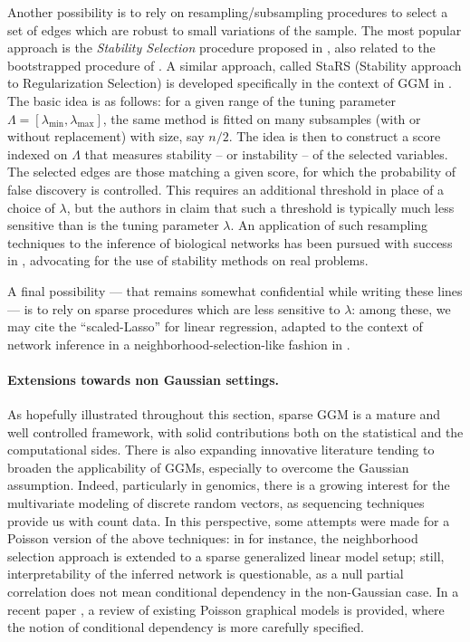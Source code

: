 Another possibility is to rely on resampling/subsampling procedures to
select a  set of  edges which  are robust to  small variations  of the
sample.  The  most popular approach is  the \emph{Stability Selection}
procedure  proposed in  \cite{2010_JRSS_Meinshausen}, also  related to
the  bootstrapped  procedure  of  \cite{bach2008bolasso}.   A  similar
approach,   called  StaRS   (Stability   approach  to   Regularization
Selection)  is  developed  specifically  in  the  context  of  GGM  in
\cite{liu2010stability}. The  basic idea  is as  follows: for  a given
range       of       the        tuning       parameter       $\Lambda=
[\lambda_{\textrm{min}},\lambda_{\textrm{max}}]$,  the same  method is
fitted on many subsamples (with or without replacement) with size, say
$n/2$. The idea is then to construct a score indexed on $\Lambda$ that
measures stability -- or instability -- of the selected variables. The
selected  edges  are those  matching  a  given  score, for  which  the
probability  of  false  discovery  is controlled.   This  requires  an
additional  threshold in  place  of  a choice  of  $\lambda$, but  the
authors  in  \cite{2010_JRSS_Meinshausen,liu2010stability} claim  that
such a threshold  is typically much less sensitive than  is the tuning
parameter $\lambda$.  An application  of such resampling techniques to
the inference of biological networks  has been pursued with success in
\cite{haury2012tigress}, advocating  for the use of  stability methods
on real problems.

A  final  possibility ---  that  remains  somewhat confidential  while
writing these lines --- is to rely on sparse procedures which are less
sensitive to $\lambda$: among these,  we may cite the ``scaled-Lasso''
\cite{sun2012scaled} for linear regression,  adapted to the context of
network   inference  in   a  neighborhood-selection-like   fashion  in
\cite{sun2013sparse}.

\paragraph*{Extensions towards  non Gaussian settings.}   As hopefully
illustrated throughout this  section, sparse GGM is a  mature and well
controlled framework, with solid contributions both on the statistical
and  the  computational sides.   There  is  also expanding  innovative
literature tending to broaden the applicability of GGMs, especially to
overcome the  Gaussian assumption.  Indeed, particularly  in genomics,
there is a growing interest  for the multivariate modeling of discrete
random vectors, as  sequencing techniques provide us  with count data.
In this perspective, some attempts were  made for a Poisson version of
the  above  techniques:  in   \cite{allen2012log}  for  instance,  the
neighborhood selection  approach is  extended to a  sparse generalized
linear model setup; still, interpretability of the inferred network is
questionable, as a null partial  correlation does not mean conditional
dependency   in   the   non-Gaussian   case.   In   a   recent   paper
\cite{yang2013poisson}, a review of  existing Poisson graphical models
is  provided,  where the  notion  of  conditional dependency  is  more
carefully specified.

